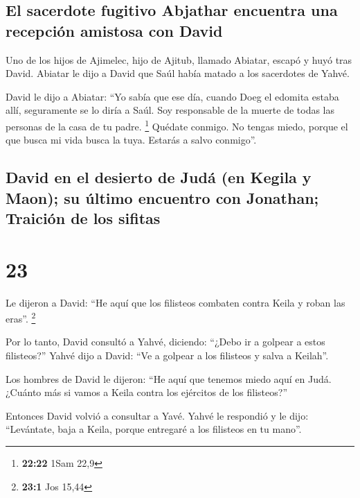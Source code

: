 \hypertarget{el-sacerdote-fugitivo-abjathar-encuentra-una-recepciuxf3n-amistosa-con-david}{%
\subsection{El sacerdote fugitivo Abjathar encuentra una recepción
amistosa con
David}\label{el-sacerdote-fugitivo-abjathar-encuentra-una-recepciuxf3n-amistosa-con-david}}

 Uno de los hijos de Ajimelec, hijo de Ajitub, llamado
Abiatar, escapó y huyó tras David.  Abiatar le dijo a
David que Saúl había matado a los sacerdotes de Yahvé.

 David le dijo a Abiatar: ``Yo sabía que ese día, cuando
Doeg el edomita estaba allí, seguramente se lo diría a Saúl. Soy
responsable de la muerte de todas las personas de la casa de tu padre.
\footnote{\textbf{22:22} 1Sam 22,9}  Quédate conmigo. No
tengas miedo, porque el que busca mi vida busca la tuya. Estarás a salvo
conmigo''.

\hypertarget{david-en-el-desierto-de-juduxe1-en-kegila-y-maon-su-uxfaltimo-encuentro-con-jonathan-traiciuxf3n-de-los-sifitas}{%
\subsection{David en el desierto de Judá (en Kegila y Maon); su último
encuentro con Jonathan; Traición de los
sifitas}\label{david-en-el-desierto-de-juduxe1-en-kegila-y-maon-su-uxfaltimo-encuentro-con-jonathan-traiciuxf3n-de-los-sifitas}}

\hypertarget{section-22}{%
\section{23}\label{section-22}}

 Le dijeron a David: ``He aquí que los filisteos combaten
contra Keila y roban las eras''. \footnote{\textbf{23:1} Jos 15,44}

 Por lo tanto, David consultó a Yahvé, diciendo: ``¿Debo
ir a golpear a estos filisteos?'' Yahvé dijo a David: ``Ve a golpear a
los filisteos y salva a Keilah''.

 Los hombres de David le dijeron: ``He aquí que tenemos
miedo aquí en Judá. ¿Cuánto más si vamos a Keila contra los ejércitos de
los filisteos?''

 Entonces David volvió a consultar a Yavé. Yahvé le
respondió y le dijo: ``Levántate, baja a Keila, porque entregaré a los
filisteos en tu mano''.

